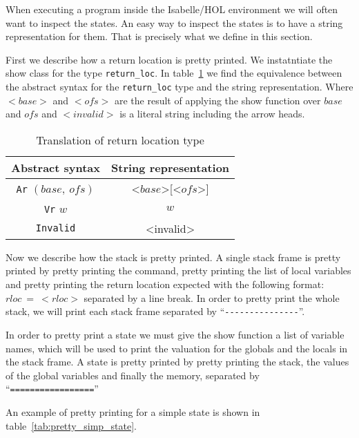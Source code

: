 When executing a program inside the Isabelle/HOL environment we will often want to inspect the states.
An easy way to inspect the states is to have a string representation for them.
That is precisely what we define in this section.

First we describe how a return location is pretty printed.
We instatntiate the show class for the type \verb|return_loc|.
In table~\ref{tab:pretty_rloc} we find the equivalence between the abstract syntax for the \verb|return_loc| type and the string representation.
Where $<base>$ and $<ofs>$ are the result of applying the show function over $base$ and $ofs$ and $<invalid>$ is a literal string including the arrow heads.

\begin{table}[h!]
\centering
\begin{tabular}{|c|c|}
  \hline
  \textbf{Abstract syntax} & \textbf{String representation} \\ [0.5ex]
  \hline \hline
  \verb|Ar| $(base,\ ofs)$ & <$base$>[<$ofs$>] \\
  \verb|Vr| $w$ & $w$ \\
  \verb|Invalid| & <invalid> \\
  \hline
\end{tabular}

\caption{Translation of return location type}
\label{tab:pretty_rloc}
\end{table}

Now we describe how the stack is pretty printed.
A single stack frame is pretty printed by pretty printing the command, pretty printing the list of local variables and pretty printing the return location expected with the following format: $rloc\ =\ <rloc>$ separated by a line break.
In order to pretty print the whole stack, we will print each stack frame separated by ``\verb|---------------|''.


In order to pretty print a state we must give the show function a list of variable names, which will be used to print the valuation for the globals and the locals in the stack frame.
A state is pretty printed by pretty printing the stack, the values of the global variables and finally the memory, separated by ``\verb|=================|''

An example of pretty printing for a simple state is shown in table~\ref{tab:pretty_simp_state}.

